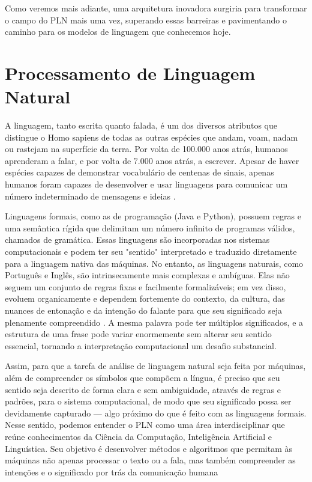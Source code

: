 Como veremos mais adiante, uma arquitetura inovadora surgiria para transformar o campo do PLN mais uma vez, superando essas barreiras e pavimentando o caminho para os modelos de linguagem que conhecemos hoje.

\section{Processamento de Linguagem Natural}
\label{sec:processamento-de-linguagem-natural}

A linguagem, tanto escrita quanto falada, é um dos diversos atributos que distingue o Homo sapiens de todas as outras espécies que andam, voam, nadam ou rastejam na superfície da terra. Por volta de 100.000 anos atrás, humanos aprenderam a falar, e por volta de 7.000 anos atrás, a escrever. Apesar de haver espécies capazes de demonstrar vocabulário de centenas de sinais, apenas humanos foram capazes de desenvolver e usar linguagens para comunicar um número indeterminado de mensagens e ideias \cite{russell_artificial_2016}.

Linguagens formais, como as de programação (Java e Python), possuem regras e uma semântica rígida que delimitam um número infinito de programas válidos, chamados de gramática. Essas linguagens são incorporadas nos sistemas computacionais e podem ter seu "sentido" interpretado e traduzido diretamente para a linguagem nativa das máquinas. No entanto, as linguagens naturais, como Português e Inglês, são intrinsecamente mais complexas e ambíguas. Elas não seguem um conjunto de regras fixas e facilmente formalizáveis; em vez disso, evoluem organicamente e dependem fortemente do contexto, da cultura, das nuances de entonação e da intenção do falante para que seu significado seja plenamente compreendido \cite{jurafsky_speech_2009}. A mesma palavra pode ter múltiplos significados, e a estrutura de uma frase pode variar enormemente sem alterar seu sentido essencial, tornando a interpretação computacional um desafio substancial.

Assim, para que a tarefa de análise de linguagem natural seja feita por máquinas, além de compreender os símbolos que compõem a língua, é preciso que seu sentido seja descrito de forma clara e sem ambiguidade, através de regras e padrões, para o sistema computacional, de modo que seu significado possa ser devidamente capturado — algo próximo do que é feito com as linguagens formais. Nesse sentido, podemos entender o PLN como uma área interdisciplinar que reúne conhecimentos da Ciência da Computação, Inteligência Artificial e Linguística. Seu objetivo é desenvolver métodos e algoritmos que permitam às máquinas não apenas processar o texto ou a fala, mas também compreender as intenções e o significado por trás da comunicação humana

